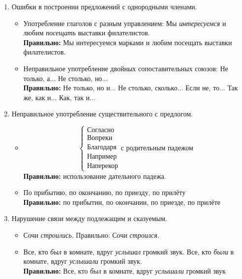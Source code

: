 \documentclass{article}
\begin{document}
\begin{enumerate}
\item
  Ошибки в построении предложений с однородными членами.
  \begin{itemize}
  \item
    Употребление глаголов с разным управлением: Мы \emph{интересуемся} и любим \emph{посещать} выставки
    филателистов.\\
    \textbf{Правильно:} Мы интересуемся марками и любим посещать выставки филателистов.
  \item
    Неправильное употребление двойных сопоставительных союзов: Не только, а... Не столько, но...\\
    \textbf{Правильно:}
    Не только, но и... Не столько, сколько... Если не, то... Так же, как и... Как, так и...
  \end{itemize}
\item
  Неправильное употребление существительного с предлогом.
  \begin{itemize}
  \item
    \begin{equation*}
      \begin{cases}
        \text{Согласно}\\
        \text{Вопреки}\\
        \text{Благодаря}\\
        \text{Например}\\
        \text{Наперекор}
      \end{cases}
      \text{с родительным падежом}
    \end{equation*}
    \textbf{Правильно:} использование дательного падежа.
  \item
    По прибытию, по окончанию, по приезду, по прилёту\\
    \textbf{Правильно:} по прибытии, по окончании, по приезде, по прилёте
  \end{itemize}
\item
  Нарушение связи между подлежащим и сказуемым.
  \begin{itemize}
  \item
    Сочи \emph{строились}. Правильно: Сочи \emph{строился}.
  \item
    Все, кто \emph{был} в комнате, вдруг \emph{услышал} громкий звук.
    Все, кто \emph{были} в комнате, вдруг \emph{услышали} громкий звук.\\
    \textbf{Правильно:} Все, кто \emph{был} в комнате, вдруг \emph{услышали} громкий звук
  \end{itemize}

\end{enumerate}
\end{document}
